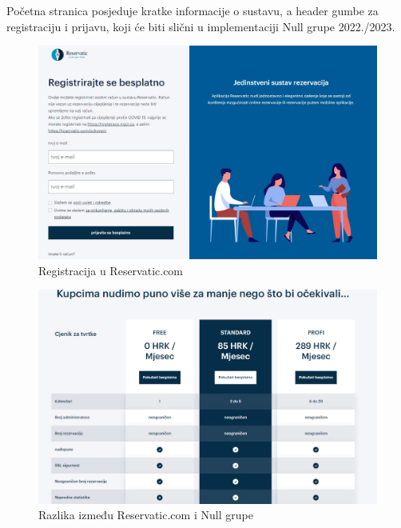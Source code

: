              
             \texttt{}{Početna stranica posjeduje kratke informacije o sustavu, a header gumbe za registraciju i prijavu, koji će biti slični u implementaciji Null grupe 2022./2023.}
             \newline
              \begin{figure}[H]
			             \includegraphics[width=\textwidth]{slike/slicne2.jpg}
			            \caption{Registracija u Reservatic.com}
			            \label{fig:slicne2} %
		            \end{figure}
            \begin{figure}[H]
			             \includegraphics[width=\textwidth]{slike/slicne3.jpg}
			            \caption{Razlika između Reservatic.com i Null grupe}
			            \label{fig:slicne3} %
		            \end{figure}

             


